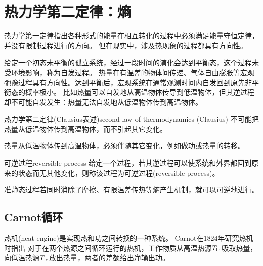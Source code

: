 \section{热力学第二定律：熵}

热力学第一定律指出各种形式的能量在相互转化的过程中必须满足能量守恒定律，并没有限制过程进行的方向。
但在现实中，涉及热现象的过程都具有方向性。

给定一个初态未平衡的孤立系统，经过一段时间的演化会达到平衡态，这个过程未受环境影响，称为自发过程。
热量在有温差的物体间传递、气体自由膨胀等宏观弛豫过程具有方向性。达到平衡后，宏观系统在通常观测时间内自发回到原先非平衡态的概率极小。
比如热量可以自发地从高温物体传导到低温物体，但其逆过程却不可能自发发生：热量无法自发地从低温物体传到高温物体。

\begin{theorem}
	{热力学第二定律(Clausius表述)}{second law of thermodynamics (Clausius)}
	不可能把热量从低温物体传到高温物体，而不引起其它变化。
\end{theorem}

\begin{corollary}
	热量从低温物体传到高温物体，必须伴随其它变化，例如做功或热量的转移。
\end{corollary}

\begin{definition}
	{可逆过程}{reversible process}
	给定一个过程，若其逆过程可以使系统和外界都回到原来的状态而无其他变化，则称该过程为可逆过程(reversible process)。
\end{definition}

\begin{corollary}
	准静态过程若同时消除了摩擦、有限温差传热等熵产生机制，就可以可逆地进行。
\end{corollary}

\subsection{Carnot循环}

热机(heat engine)是实现热和功之间转换的一种系统。
Carnot在1824年研究热机时指出
对于在两个热源之间循环运行的热机，工作物质从高温热源$T_{\mathrm{hi}}$吸取热量，向低温热源$T_{\mathrm{lo}}$放出热量，两者的差额给出净输出功。

